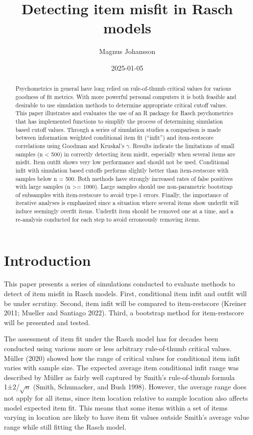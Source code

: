 \documentclass[
  letterpaper,
  DIV=11,
  numbers=noendperiod]{scrartcl}
\title{Detecting item misfit in Rasch models}
\author{Magnus Johansson}
\date{2025-01-05}
\begin{document}
\maketitle
\begin{abstract}
Psychometrics in general have long relied on rule-of-thumb critical
values for various goodness of fit metrics. With more powerful personal
computers it is both feasible and desirable to use simulation methods to
determine appropriate critical cutoff values. This paper illustrates and
evaluates the use of an R package for Rasch psychometrics that has
implemented functions to simplify the process of determining simulation
based cutoff values. Through a series of simulation studies a comparison
is made between information weighted conditional item fit (``infit'')
and item-restscore correlations using Goodman and Kruskal's \(\gamma\).
Results indicate the limitations of small samples (n \textless{} 500) in
correctly detecting item misfit, especially when several items are
misfit. Item outfit shows very low performance and should not be used.
Conditional infit with simulation based cutoffs performs slightly better
than item-restscore with samples below n = 500. Both methods have
strongly increased rates of false positives with large samples (n
\textgreater= 1000). Large samples should use non-parametric bootstrap
of subsamples with item-restscore to avoid type-1 errors. Finally, the
importance of iterative analyses is emphasized since a situation where
several items show underfit will induce seemingly overfit items.
Underfit item should be removed one at a time, and a re-analysis
conducted for each step to avoid erroneously removing items.
\end{abstract}


\section{Introduction}\label{introduction}

This paper presents a series of simulations conducted to evaluate
methods to detect of item misfit in Rasch models. First, conditional
item infit and outfit will be under scrutiny. Second, item infit will be
compared to item-restscore (Kreiner 2011; Mueller and Santiago 2022).
Third, a bootstrap method for item-restscore will be presented and
tested.

The assessment of item fit under the Rasch model has for decades been
conducted using various more or less arbitrary rule-of-thumb critical
values. Müller (2020) showed how the range of critical values for
conditional item infit varies with sample size. The expected average
item conditional infit range was described by Müller as fairly well
captured by Smith's rule-of-thumb formula 1±2/\(\sqrt{n}\) (Smith,
Schumacker, and Bush 1998). However, the average range does not apply
for all items, since item location relative to sample location also
affects model expected item fit. This means that some items within a set
of items varying in location are likely to have item fit values outside
Smith's average value range while still fitting the Rasch model.
\end{document}
